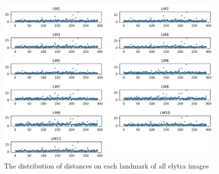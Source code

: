 \documentclass[review]{elsarticle}
\begin{document}
\begin{figure}[htbp]
    \centering
    \includegraphics[width=.95\textwidth]{images/charts/elytre_2.png}
    \caption{The distribution of distances on each landmark of all elytra images}
    \label{dtelytre}
\end{figure}
\end{document}
